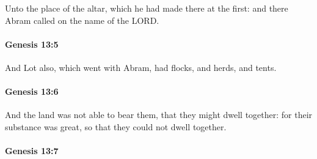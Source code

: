 			Unto the place of the altar, which he had made there at the first: and there Abram called on the name of the LORD.


		\paragraph{Genesis 13:5} %
			\label{GENESIS-13-5}

			And Lot also, which went with Abram, had flocks, and herds, and tents.


		\paragraph{Genesis 13:6} %
			\label{GENESIS-13-6}

			And the land was not able to bear them, that they might dwell together: for their substance was great, so that they could not dwell together.


		\paragraph{Genesis 13:7} %
			\label{GENESIS-13-7}

